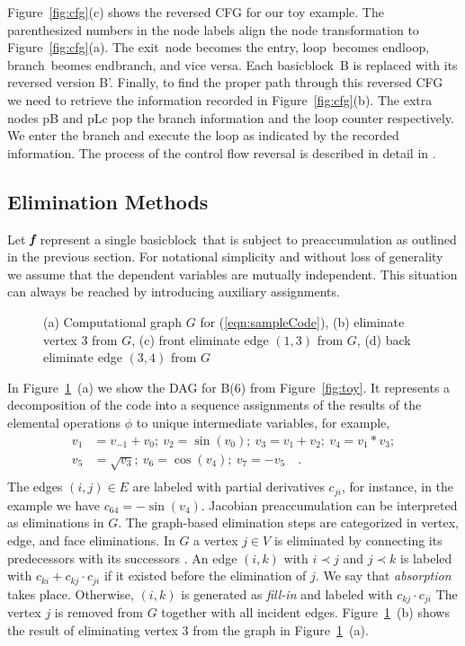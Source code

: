 \documentclass[acmtocl,acmnow]{acmtrans2m}
\newcommand{\entry}{entry}
\newcommand{\exit}{exit}
\newcommand{\Loop}{loop}
\newcommand{\EndLoop}{endloop}
\newcommand{\branch}{branch}
\newcommand{\EndBranch}{endbranch}
\newcommand{\basicblock}{basicblock}
\newcommand{\bmf}{\mbox{\bf\em f}}
\newcommand{\refeqn}[1]{(\ref{#1})}
\newcommand{\reffig}[1]{Figure~\ref{#1}}
\begin{document}
\reffig{fig:cfg}(c) shows the reversed CFG for our toy example. 
The parenthesized numbers in the node labels align the 
node transformation to \reffig{fig:cfg}(a). 
The \exit\ node becomes 
the \entry, \Loop\ becomes \EndLoop, \branch\ beomes \EndBranch, and vice versa. 
Each \basicblock\  B is replaced with its reversed version B'.  
Finally, to find the proper path through this reversed CFG we need to retrieve 
the information recorded in  \reffig{fig:cfg}(b). The extra nodes pB and pLc 
pop the branch information and the loop counter respectively.  
We enter the branch and execute the loop as indicated by the recorded information. 
The process of the control flow reversal is described in detail in 
\cite{NULF04CFR}. 
\subsection{Elimination Methods} \label{ssec:elimMeth}
Let $\bmf$ represent a single \basicblock\ that is subject to preaccumulation
as outlined in the previous section.
For notational simplicity and without loss of generality we assume that the 
dependent variables are mutually independent. 
This situation can always be
reached by introducing auxiliary assignments.
\begin{figure}[ht]
\centering{}
\caption{
(a) Computational graph $G$ for \refeqn{eqn:sampleCode}, 
(b) eliminate vertex 3 from $G$, 
(c) front eliminate edge $(1,3)$ from $G$, 
(d) back eliminate edge $(3,4)$ from $G$} 
\label{fig:elims}
\end{figure}
In \reffig{fig:elims}~(a) we show the DAG for B(6) from \reffig{fig:toy}. 
It represents a decomposition of the code into a sequence assignments of
the results of the elemental operations $\phi$ to unique intermediate 
variables,
for example,
\begin{equation}\label{eqn:sampleCode}
\begin{split}
 v_1&=v_{-1}+v_0;~v_2=\sin(v_0);~v_3=v_1+v_2;~v_4=v_1*v_3; \\
v_5&=\sqrt{v_3};~v_6=\cos(v_4);~v_7=-v_5 \quad .\\
\end{split}
\end{equation}
The edges $(i,j)\in E$ are labeled with partial derivatives
$c_{ji}$, for instance, in the 
example we have $c_{64}=-\sin(v_4)$.
Jacobian preaccumulation can be interpreted as eliminations in $G$.
The graph-based elimination steps are categorized in vertex, edge, and face 
eliminations. 
In $G$ a vertex $j \in V$ is eliminated by connecting its predecessors with
its successors \cite{GrRe91}.
An edge $(i,k)$ with
$i \prec j$ and $j \prec k$ is labeled with
$c_{ki}+c_{kj} \cdot c_{ji}$ if it existed before the elimination of $j.$
We say that {\em absorption} takes place.
Otherwise, $(i,k)$ is generated as {\em fill-in} and labeled
with $c_{kj} \cdot c_{ji}$
The vertex $j$ is removed from
$G$ together with all incident edges. 
\reffig{fig:elims}~(b) shows the result of eliminating vertex $3$
from the graph in \reffig{fig:elims}~(a).
\end{document}
